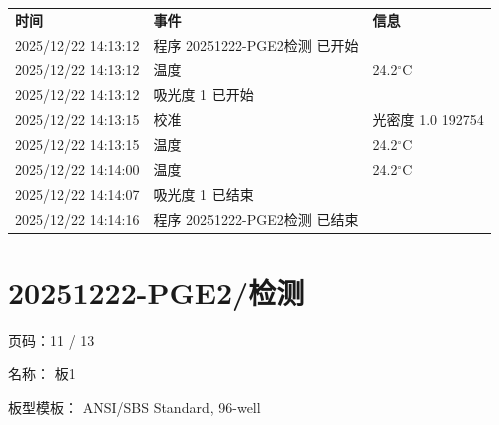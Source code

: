 \documentclass[UTF8,10pt,a4paper,fontset=fandol]{ctexart}
\newcommand{\fieldvalue}[1]{#1}
\begin{document}
\begin{tabular}{@{}p{3.6cm}p{5.1cm}p{4.0cm}@{}}
\textbf{时间} & \textbf{事件} & \textbf{信息} \\[2pt]
2025/12/22 14:13:12 & 程序 20251222-PGE2检测 已开始 & \\ 
2025/12/22 14:13:12 & 温度 & 24.2$^\circ$C \\
2025/12/22 14:13:12 & 吸光度 1 已开始 & \\
2025/12/22 14:13:15 & 校准 & 光密度 1.0 192754 \\
2025/12/22 14:13:15 & 温度 & 24.2$^\circ$C \\
2025/12/22 14:14:00 & 温度 & 24.2$^\circ$C \\
2025/12/22 14:14:07 & 吸光度 1 已结束 & \\
2025/12/22 14:14:16 & 程序 20251222-PGE2检测 已结束 &
\end{tabular}


\newpage

\section{20251222-PGE2/检测}

\noindent
页码：11 / 13

\noindent
名称：
\fieldvalue{板1}

\noindent
板型模板：
\fieldvalue{ANSI/SBS Standard, 96-well}
\end{document}
